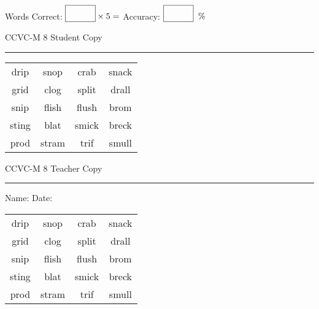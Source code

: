 \documentclass{memoir}
\begin{document}
\small

Words Correct: $\fbox{\phantom{\huge 100}} \times 5 = $ Accuracy: $\fbox{\phantom{\huge 100}}\;\; \%$ 

\vfill

\newpage


\footnotesize \noindent
CCVC-M 8 \hfill Student Copy
\smallskip
\hrule

\Large

\setlength{\tabcolsep}{14pt}
\def\arraystretch{3}

{\selectfont


\begin{vplace}[0.5]
\begin{center}
\begin{tabular}{cccc}
drip & snop & crab        & snack \\
grid & clog & split & drall \\
snip & flish             & flush & brom          \\
sting & blat & smick & breck       \\
prod & stram & trif & smull \\
\end{tabular}
\end{center}
\end{vplace}

}

\newpage

\footnotesize \noindent
CCVC-M 8 \hfill Teacher Copy
\smallskip
\hrule

\small

\vfill

\noindent
Name: \underline{\hspace{1.75in}} \hfill Date: \underline{\hspace{1in}}

\Large

{\selectfont


\begin{vplace}[0.5]
\begin{center}
\begin{tabular}{cccc}
drip & snop & crab        & snack \\
grid & clog & split & drall \\
snip & flish             & flush & brom          \\
sting & blat & smick & breck       \\
prod & stram & trif & smull \\
\end{tabular}
\end{center}
\end{vplace}



}
\end{document}
